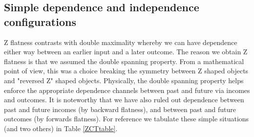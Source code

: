 \documentclass[10pt]{article}
\begin{document}
\subsection{Simple dependence and independence configurations}



Z flatness contrasts with double maximality whereby we can have dependence either way between an earlier input and a later outcome.  The reason we obtain Z flatness is that we assumed the double spanning property.  From a mathematical point of view, this was a choice breaking the symmetry between Z shaped objects and "reversed Z" shaped objects.  Physically, the double spanning property helps enforce the appropriate dependence channels between past and future via incomes and outcomes.  It is noteworthy that we have also ruled out dependence between past and future incomes (by backward flatness), and between past and future outcomes (by forwards flatness).  For reference we tabulate these simple situations (and two others) in Table \ref{ZCTtable}.
%
%
\end{document}
